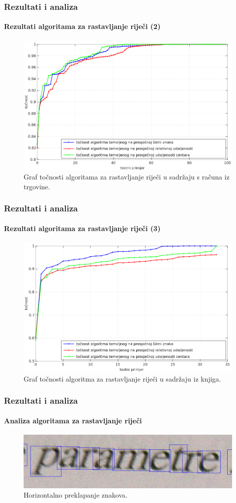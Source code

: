 \documentclass{beamer}
\begin{document}
\begin{frame}
\frametitle{Rezultati i analiza}
\framesubtitle{Rezultati algoritama za rastavljanje riječi (2)}
\begin{figure}[htb]
    \centering
    \includegraphics[width=.8\textwidth]{images/result-03.png}
    \caption{
        Graf točnosti algoritama za rastavljanje riječi u sadržaju s računa iz
        trgovine.
    }
    \label{fig:result-03}
\end{figure}
\end{frame}
\begin{frame}
\frametitle{Rezultati i analiza}
\framesubtitle{Rezultati algoritama za rastavljanje riječi (3)}
\begin{figure}[htb]
    \centering
    \includegraphics[width=.8\textwidth]{images/result-04.png}
    \caption{
        Graf točnosti algoritma za rastavljanje riječi u sadržaju iz knjiga.
    }
    \label{fig:result-04}
\end{figure}
\end{frame}
\begin{frame}
\frametitle{Rezultati i analiza}
\framesubtitle{Analiza algoritama za rastavljanje riječi}
\begin{figure}[htb]
    \centering
    \includegraphics[width=\textwidth]{images/error-02.png}
    \caption{
        Horizontalno preklapanje znakova.
    }
    \label{fig:error-02}
\end{figure}
\end{frame}
\end{document}
